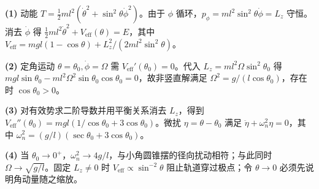 \par\noindent\textbf{(1)} 动能 \(T=\frac12ml^2(\dot\theta^2+\sin^2\theta\dot\phi^2)\)。由于 \(\phi\) 循环，\(p_\phi=ml^2\sin^2\theta\dot\phi=L_z\) 守恒。消去 \(\dot\phi\) 得 \(\frac12ml^2\dot\theta^2+V_{\mathrm{eff}}(\theta)=E\)，其中 \(V_{\mathrm{eff}}=mgl(1-\cos\theta)+L_z^2/(2ml^2\sin^2\theta)\)。
\par\noindent\textbf{(2)} 定角运动 \(\theta=\theta_0,\dot\phi=\Omega\) 需 \(V_{\mathrm{eff}}'(\theta_0)=0\)。代入 \(L_z=ml^2\Omega\sin^2\theta_0\) 得 \(mgl\sin\theta_0-ml^2\Omega^2\sin\theta_0\cos\theta_0=0\)，故非竖直解满足 \(\Omega^2=g/(l\cos\theta_0)\)，存在时 \(\cos\theta_0>0\)。
\par\noindent\textbf{(3)} 对有效势求二阶导数并用平衡关系消去 \(L_z\)，得到 \(V_{\mathrm{eff}}''(\theta_0)=mgl(1/\cos\theta_0+3\cos\theta_0)\)。微扰 \(\eta=\theta-\theta_0\) 满足 \(\ddot\eta+\omega_n^2\eta=0\)，其中 \(\omega_n^2=(g/l)(\sec\theta_0+3\cos\theta_0)\)。
\par\noindent\textbf{(4)} 当 \(\theta_0\to0^+\)，\(\omega_n^2\to4g/l\)，与小角圆锥摆的径向扰动相符；与此同时 \(\Omega\to\sqrt{g/l}\)。固定 \(L_z\ne0\) 时 \(V_{\mathrm{eff}}\propto\sin^{-2}\theta\) 阻止轨道穿过极点；令 \(\theta\to0\) 必须先说明角动量随之缩放。
